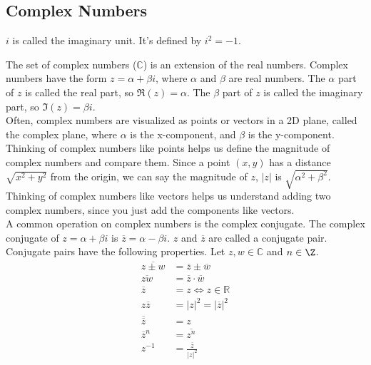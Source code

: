 \subsection{Complex Numbers}
\begin{definition}
	$i$ is called the imaginary unit. It's defined by $i^2 = -1$.
\end{definition}


\noindent
The set of complex numbers ($\mathbb{C}$) is an extension of the real numbers. Complex numbers have the form $z = \alpha + \beta i$, where $\alpha$ and $\beta$ are real numbers. The $\alpha$ part of $z$ is called the real part, so $\Re(z) = \alpha$. The $\beta$ part of $z$ is called the imaginary part, so $\Im(z) = \beta i$.\\

\noindent
Often, complex numbers are visualized as points or vectors in a 2D plane, called the complex plane, where $\alpha$ is the x-component, and $\beta$ is the y-component. Thinking of complex numbers like points helps us define the magnitude of complex numbers and compare them. Since a point $(x,y)$ has a distance $\sqrt{x^2+y^2}$ from the origin, we can say the magnitude of $z$, $\lvert z \rvert$ is $\sqrt{\alpha^2 + \beta^2}$. Thinking of complex numbers like vectors helps us understand adding two complex numbers, since you just add the components like vectors.\\

\noindent
A common operation on complex numbers is the complex conjugate. The complex conjugate of $z = \alpha + \beta i$ is $\overline{z} = \alpha - \beta i$. $z$ and $\overline{z}$ are called a conjugate pair.\\

\noindent
Conjugate pairs have the following properties.
Let $z, w \in \mathbb{C}$ and $n \in \Z$.
\begin{align*}
	\overline{z \pm w} &= \overline{z} \pm \overline{w} \\
	\overline{zw} &= \overline{z}\cdot\overline{w} \\
	\overline{z} &= z \Leftrightarrow z \in \mathbb{R} \\
	z\overline{z} &= \lvert z \rvert^2 = \lvert \overline{z} \rvert^2 \\
	\overline{\overline{z}} &= z \\
	\overline{z}^n &= \overline{z^n} \\
	z^{-1} &= \frac{\overline{z}}{\lvert z \rvert^2} 
\end{align*}
